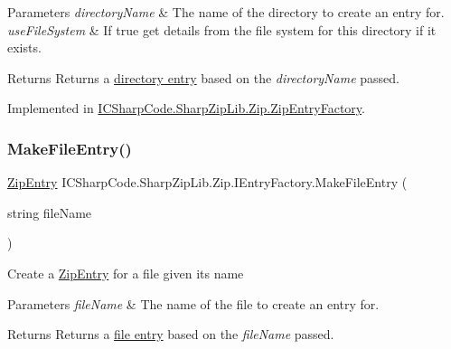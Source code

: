 \begin{DoxyParams}{Parameters}
{\em directory\+Name} & The name of the directory to create an entry for.\\
\hline
{\em use\+File\+System} & If true get details from the file system for this directory if it exists.\\
\hline
\end{DoxyParams}
\begin{DoxyReturn}{Returns}
Returns a \hyperlink{class_i_c_sharp_code_1_1_sharp_zip_lib_1_1_zip_1_1_zip_entry}{directory entry} based on the {\itshape directory\+Name}  passed.
\end{DoxyReturn}


Implemented in \hyperlink{class_i_c_sharp_code_1_1_sharp_zip_lib_1_1_zip_1_1_zip_entry_factory_a9fcaf5dd4ef695b41c6203a8f1e4d119}{I\+C\+Sharp\+Code.\+Sharp\+Zip\+Lib.\+Zip.\+Zip\+Entry\+Factory}.

\mbox{\label{interface_i_c_sharp_code_1_1_sharp_zip_lib_1_1_zip_1_1_i_entry_factory_abd40e3d5f65ca49251dff1cf9a039010}} 
\subsubsection{\texorpdfstring{Make\+File\+Entry()}{MakeFileEntry()}\hspace{0.1cm}{\footnotesize\ttfamily [1/2]}}
{\footnotesize\ttfamily \hyperlink{class_i_c_sharp_code_1_1_sharp_zip_lib_1_1_zip_1_1_zip_entry}{Zip\+Entry} I\+C\+Sharp\+Code.\+Sharp\+Zip\+Lib.\+Zip.\+I\+Entry\+Factory.\+Make\+File\+Entry (\begin{DoxyParamCaption}\item[{string}]{file\+Name }\end{DoxyParamCaption})}



Create a \hyperlink{class_i_c_sharp_code_1_1_sharp_zip_lib_1_1_zip_1_1_zip_entry}{Zip\+Entry} for a file given its name 


\begin{DoxyParams}{Parameters}
{\em file\+Name} & The name of the file to create an entry for.\\
\hline
\end{DoxyParams}
\begin{DoxyReturn}{Returns}
Returns a \hyperlink{class_i_c_sharp_code_1_1_sharp_zip_lib_1_1_zip_1_1_zip_entry}{file entry} based on the {\itshape file\+Name}  passed.
\end{DoxyReturn}



